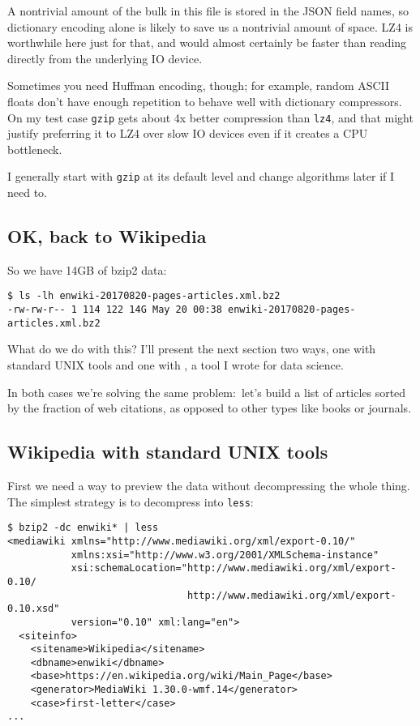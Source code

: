A nontrivial amount of the bulk in this file is stored in the JSON field names,
so dictionary encoding alone is likely to save us a nontrivial amount of space.
LZ4 is worthwhile here just for that, and would almost certainly be faster than
reading directly from the underlying IO device.

Sometimes you need Huffman encoding, though; for example, random ASCII floats
don't have enough repetition to behave well with dictionary compressors. On my
test case {\tt gzip} gets about 4x better compression than {\tt lz4}, and that
might justify preferring it to LZ4 over slow IO devices even if it creates a CPU
bottleneck.

I generally start with {\tt gzip} at its default level and change algorithms
later if I need to.

\subsection{OK, back to Wikipedia}
So we have 14GB of bzip2 data:

\begin{verbatim}
$ ls -lh enwiki-20170820-pages-articles.xml.bz2
-rw-rw-r-- 1 114 122 14G May 20 00:38 enwiki-20170820-pages-articles.xml.bz2\end{verbatim}

What do we do with this? I'll present the next section two ways, one with
standard UNIX tools and one with ,
a tool I wrote for data science.

In both cases we're solving the same problem:~let's build a list of articles
sorted by the fraction of web citations, as opposed to other types like books or
journals.

\subsection{Wikipedia with standard UNIX tools}
First we need a way to preview the data without decompressing the whole thing.
The simplest strategy is to decompress into {\tt less}:

\begin{verbatim}
$ bzip2 -dc enwiki* | less
<mediawiki xmlns="http://www.mediawiki.org/xml/export-0.10/"
           xmlns:xsi="http://www.w3.org/2001/XMLSchema-instance"
           xsi:schemaLocation="http://www.mediawiki.org/xml/export-0.10/
                               http://www.mediawiki.org/xml/export-0.10.xsd"
           version="0.10" xml:lang="en">
  <siteinfo>
    <sitename>Wikipedia</sitename>
    <dbname>enwiki</dbname>
    <base>https://en.wikipedia.org/wiki/Main_Page</base>
    <generator>MediaWiki 1.30.0-wmf.14</generator>
    <case>first-letter</case>
... \end{verbatim}

